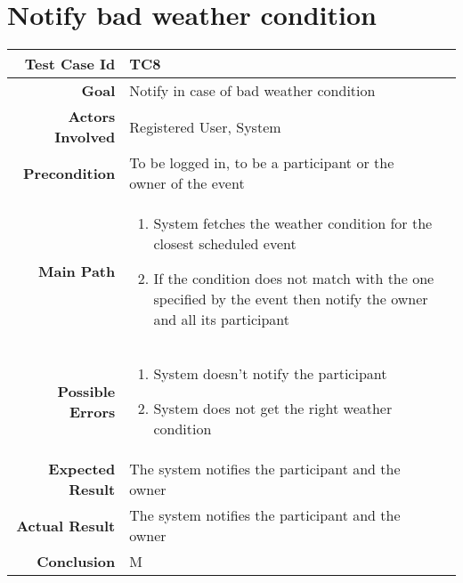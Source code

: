 \section{Notify bad weather condition}
\begin{tabularx}{\linewidth}{|r|X|X|}
\hline   {\bf Test Case Id} &  TC8\\
  \hline  {\bf Goal} & Notify in case of bad weather condition\\
  \hline  {\bf Actors Involved} & Registered User, System\\
  \hline  {\bf Precondition} & To be logged in, to be a participant or the owner of the event\\ 
   \hline  {\bf Main Path} & \begin{enumerate} 
   \item System fetches the weather condition for the closest scheduled event
    \item If the condition does not match with the one specified by the event then notify the owner and all its participant
   \end{enumerate}\\
   \hline  {\bf Possible Errors} & \begin{enumerate} 
   \item System doesn't notify the participant
   \item System does not get the right weather condition 
   \end{enumerate}\\
  \hline  {\bf Expected Result} & The system notifies the participant and the owner\\
  \hline  {\bf Actual Result} & The system notifies the participant and the owner\\
  \hline  {\bf Conclusion} & M\\
  \hline
  
\end{tabularx}

